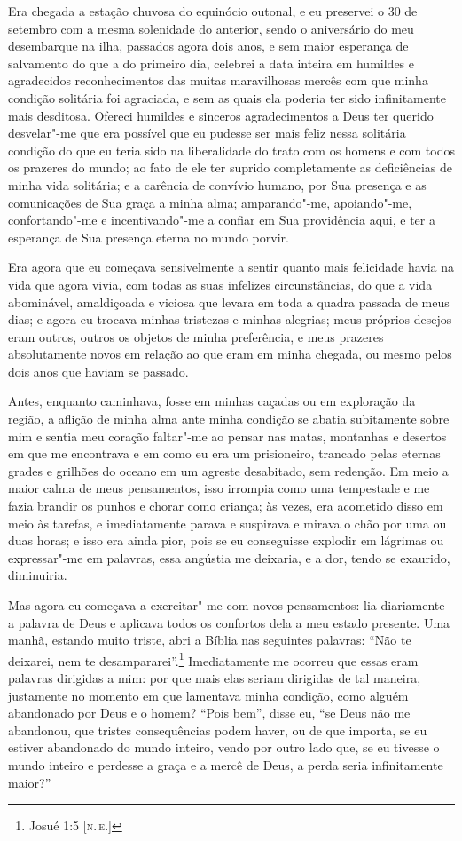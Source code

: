 Era chegada a estação chuvosa do equinócio outonal, e eu preservei o 30
de setembro com a mesma solenidade do anterior, sendo o aniversário do
meu desembarque na ilha, passados agora dois anos, e sem maior esperança
de salvamento do que a do primeiro dia, celebrei a data inteira em
humildes e agradecidos reconhecimentos das muitas maravilhosas mercês
com que minha condição solitária foi agraciada, e sem as quais ela
poderia ter sido infinitamente mais desditosa. Ofereci humildes e
sinceros agradecimentos a Deus ter querido desvelar"-me que era possível
que eu pudesse ser mais feliz nessa solitária condição do que eu teria
sido na liberalidade do trato com os homens e com todos os prazeres do
mundo; ao fato de ele ter suprido completamente as deficiências de minha
vida solitária; e a carência de convívio humano, por Sua presença e as
comunicações de Sua graça a minha alma; amparando"-me, apoiando"-me,
confortando"-me e incentivando"-me a confiar em Sua providência aqui, e
ter a esperança de Sua presença eterna no mundo porvir.

Era agora que eu começava sensivelmente a sentir quanto mais felicidade
havia na vida que agora vivia, com todas as suas infelizes
circunstâncias, do que a vida abominável, amaldiçoada e viciosa que
levara em toda a quadra passada de meus dias; e agora eu trocava minhas
tristezas e minhas alegrias; meus próprios desejos eram outros, outros
os objetos de minha preferência, e meus prazeres absolutamente novos em
relação ao que eram em minha chegada, ou mesmo pelos dois anos que
haviam se passado.

Antes, enquanto caminhava, fosse em minhas caçadas ou em exploração da
região, a aflição de minha alma ante minha condição se abatia
subitamente sobre mim e sentia meu coração faltar"-me ao pensar nas
matas, montanhas e desertos em que me encontrava e em como eu era um
prisioneiro, trancado pelas eternas grades e grilhões do oceano em um
agreste desabitado, sem redenção. Em meio a maior calma de meus
pensamentos, isso irrompia como uma tempestade e me fazia brandir os
punhos e chorar como criança; às vezes, era acometido disso em meio às
tarefas, e imediatamente parava e suspirava e mirava o chão por uma ou
duas horas; e isso era ainda pior, pois se eu conseguisse explodir em
lágrimas ou expressar"-me em palavras, essa angústia me deixaria, e a
dor, tendo se exaurido, diminuiria.

Mas agora eu começava a exercitar"-me com novos pensamentos: lia
diariamente a palavra de Deus e aplicava todos os confortos dela a meu
estado presente. Uma manhã, estando muito triste, abri a Bíblia nas
seguintes palavras: ``Não te deixarei, nem te desampararei''.\footnote{Josué
  1:5 {[}\textsc{n.\,e.}{]}} Imediatamente me ocorreu que essas eram palavras
dirigidas a mim: por que mais elas seriam dirigidas de tal maneira,
justamente no momento em que lamentava minha condição, como alguém
abandonado por Deus e o homem? ``Pois bem'', disse eu, ``se Deus não me
abandonou, que tristes consequências podem haver, ou de que importa, se
eu estiver abandonado do mundo inteiro, vendo por outro lado que, se eu
tivesse o mundo inteiro e perdesse a graça e a mercê de Deus, a perda
seria infinitamente maior?''

